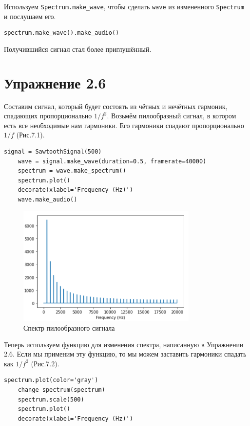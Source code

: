 \documentclass[a4paper,12pt]{report}
\begin{document}
    Используем \texttt{Spectrum.make\_wave}, чтобы сделать \texttt{wave} из измененного \texttt{Spectrum} и послушаем его.
\begin{lstlisting}[caption=Воспроизведение сигнала]
    spectrum.make_wave().make_audio()
\end{lstlisting}

    Получившийся сигнал стал более приглушённый.
\chapter{Упражнение 2.6} 
    Составим сигнал, который будет состоять из чётных и нечётных гармоник, спадающих пропорционально $1/f^2$. Возьмём пилообразный сигнал, в котором есть все необходимые нам гармоники. Его гармоники спадают пропорционально $1/f$ (Рис.7.1).
\begin{lstlisting}[caption=Создание пилообразного сигнала]
    signal = SawtoothSignal(500)
    wave = signal.make_wave(duration=0.5, framerate=40000)
    spectrum = wave.make_spectrum()
    spectrum.plot()
    decorate(xlabel='Frequency (Hz)')
    wave.make_audio()
\end{lstlisting}

\begin{figure}[H]
        \centering
        \includegraphics[width=0.8\textwidth]{fig7-1.PNG}
        \caption{Спектр пилообразного сигнала}
        \label{fig:fig7-1}
\end{figure}

    Теперь используем функцию для изменения спектра, написанную в Упражнении 2.6. Если мы применим эту функцию, то мы можем заставить гармоники спадать как $1/f^2$ (Рис.7.2).
\begin{lstlisting}[caption=Применение функции change\_spectrum к сигналу]
    spectrum.plot(color='gray')
    change_spectrum(spectrum)
    spectrum.scale(500)
    spectrum.plot()
    decorate(xlabel='Frequency (Hz)')
\end{lstlisting}
\end{document}
